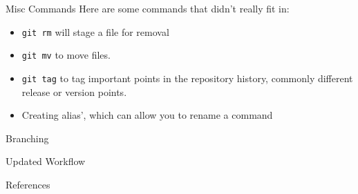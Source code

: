 \documentclass{beamer}
\begin{document}
\begin{frame}{Misc Commands}
Here are some commands that didn't really fit in:
\begin{itemize}
    \item \texttt{git rm} will stage a file for removal
    \item \texttt{git mv} to move files. 
    \item \texttt{git tag} to tag important points in the repository history, commonly different release or version points.
    \item Creating alias', which can allow you to rename a command
\end{itemize}
\end{frame}

\begin{frame}{Branching}
    
\end{frame}

\begin{frame}{Updated Workflow}
    
\end{frame}

\begin{frame}{References}
    \printbibliography[heading=none]
\end{frame}
\end{document}
